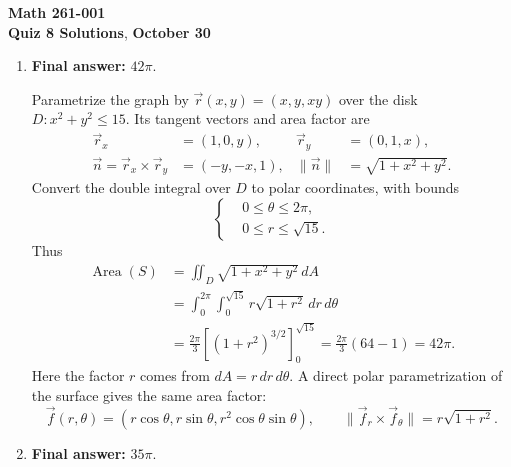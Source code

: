 \documentclass[12pt]{exam}
\newcommand{\class}{Math 261-001}
\newcommand{\examnum}{Quiz 8 Solutions}
\newcommand{\examdate}{October 30}
\begin{document}
\pagestyle{plain}
\thispagestyle{empty}

\noindent
\textbf{\class}\\
\textbf{\examnum}, \textbf{\examdate}

\vspace{8pt}
\small
\setlength{\abovedisplayskip}{6pt}
\setlength{\belowdisplayskip}{6pt}
\setlength{\abovedisplayshortskip}{3pt}
\setlength{\belowdisplayshortskip}{6pt}
\begin{enumerate}

\item \textbf{Final answer:} $\boxed{42\pi}$.

Parametrize the graph by $\vec r(x,y)=(x,y,xy)$ over the disk
$D: x^2+y^2\le15$. Its tangent vectors and area factor are
\[
\begin{aligned}
\vec r_x&=(1,0,y),& \vec r_y&=(0,1,x),\\
\vec n = \vec r_x\times\vec r_y&=(-y,-x,1),&
\|\vec n\|&=\sqrt{1+x^2+y^2}.
\end{aligned}
\]
Convert the double integral over $D$ to polar coordinates, with bounds
\[
\left\{
\begin{aligned}
&0\le\theta\le2\pi,\\
&0\le r\le\sqrt{15}.
\end{aligned}
\right.
\]
Thus
\[
\begin{aligned}
\operatorname{Area}(S)
&=\iint_D\sqrt{1+x^2+y^2}\,dA\\
&=\int_0^{2\pi}\int_0^{\sqrt{15}}r\sqrt{1+r^2}\,dr\,d\theta\\
&=\frac{2\pi}{3}\left[(1+r^2)^{3/2}\right]_0^{\sqrt{15}}
=\frac{2\pi}{3}(64-1)=42\pi.
\end{aligned}
\]
Here the factor $r$ comes from $dA=r\,dr\,d\theta$. A direct polar
parametrization of the surface gives the same area factor:
\[
\vec f(r,\theta)=(r\cos\theta,r\sin\theta,r^2\cos\theta\sin\theta),
\qquad \|\vec f_r\times\vec f_\theta\|=r\sqrt{1+r^2}.
\]

\medskip
\item \textbf{Final answer:} $\boxed{35\pi}$.


\end{enumerate}
\end{document}
